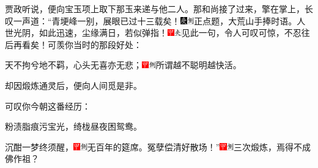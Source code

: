 贾政听说，便向宝玉项上取下那玉来递与他二人。那和尚接了过来，擎在掌上，长叹一声道：``青埂峰一别，展眼已过十三载矣！{\includegraphics[width=3mm]{../Images/00004}\includegraphics[width=3mm]{../Images/00011}\footnotesize \kaishu 正点题，大荒山手捧时语。}人世光阴，如此迅速，尘缘满日，若似弹指！{\includegraphics[width=3mm]{../Images/00002}\includegraphics[width=3mm]{../Images/00012}\footnotesize \kaishu 见此一句，令人可叹可惊，不忍往后再看矣！}可羡你当时的那段好处：

天不拘兮地不羁，心头无喜亦无悲；{\includegraphics[width=3mm]{../Images/00002}\includegraphics[width=3mm]{../Images/00011}\footnotesize \kaishu 所谓越不聪明越快活。}

却因煅炼通灵后，便向人间觅是非。

可叹你今朝这番经历：

粉渍脂痕污宝光，绮栊昼夜困鸳鸯。

沉酣一梦终须醒，{\includegraphics[width=3mm]{../Images/00002}\includegraphics[width=3mm]{../Images/00011}\footnotesize \kaishu 无百年的筵席。}冤孽偿清好散场！''{\includegraphics[width=3mm]{../Images/00002}\includegraphics[width=3mm]{../Images/00011}\footnotesize \kaishu 三次煅炼，焉得不成佛作祖？}

